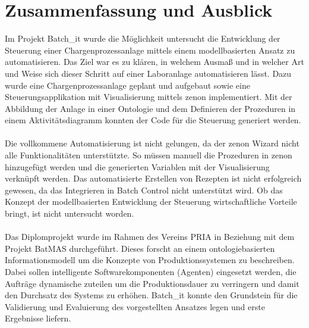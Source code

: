 

\chapter{Zusammenfassung und Ausblick} \label{chapter:conclusion}

Im Projekt Batch\_it wurde die Möglichkeit untersucht die Entwicklung der Steuerung einer Chargenprozessanlage mittels einem modellbasierten Ansatz zu automatisieren. Das Ziel war es zu klären, in welchem Ausmaß und in welcher Art und Weise sich dieser Schritt auf einer Laboranlage automatisieren lässt. Dazu wurde eine Chargenprozessanlage geplant und aufgebaut sowie eine Steuerungsapplikation mit Visualisierung mittels zenon implementiert. 
Mit der Abbildung der Anlage in einer Ontologie und dem Definieren der Prozeduren in einem Aktivitätsdiagramm konnten der Code für die Steuerung generiert werden. \\\\
Die vollkommene Automatisierung ist nicht gelungen, da der zenon Wizard nicht alle Funktionalitäten unterstützte. So müssen manuell die Prozeduren in zenon hinzugefügt werden und die generierten Variablen mit der Visualisierung verknüpft werden. Das automatisierte Erstellen von Rezepten ist nicht erfolgreich gewesen, da das Integrieren in Batch Control nicht unterstützt wird. Ob das Konzept der modellbasierten Entwicklung der Steuerung wirtschaftliche Vorteile bringt, ist nicht untersucht worden. \\\\
Das Diplomprojekt wurde im Rahmen des Vereins \ac{PRIA} in Beziehung mit dem Projekt \ac{BatMAS} durchgeführt. Dieses forscht an einem ontologiebasierten Informationsmodell um die Konzepte von Produktionssystemen zu beschreiben. Dabei sollen intelligente Softwarekomponenten (Agenten) eingesetzt werden, die Aufträge dynamische zuteilen um die Produktionsdauer zu verringern und damit den Durchsatz des Systems zu erhöhen. Batch\_it konnte den Grundstein für die Validierung und Evaluierung des vorgestellten Ansatzes legen und erste Ergebnisse liefern.\\\\
